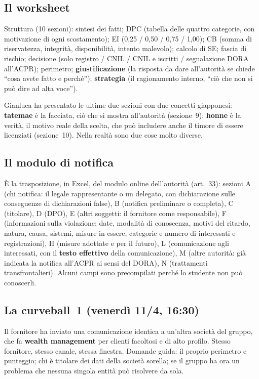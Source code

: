 \subsection{Il worksheet}
Struttura (10 sezioni): sintesi dei fatti; DPC (tabella delle quattro categorie, con motivazione di
ogni scostamento); EI (0,25 / 0,50 / 0,75 / 1,00); CB (somma di riservatezza, integrità, disponibilità,
intento malevolo); calcolo di SE; fascia di rischio; decisione (solo registro / CNIL / CNIL e iscritti
/ segnalazione DORA all'ACPR); perimetro; \textbf{giustificazione} (la risposta da dare all'autorità
se chiede ``cosa avete fatto e perché''); \textbf{strategia} (il ragionamento interno, ``ciò che non
si può dire ad alta voce'').

\begin{nota}
Gianluca ha presentato le ultime due sezioni con due concetti giapponesi: \textbf{tatemae} è la
facciata, ciò che si mostra all'autorità (sezione~9); \textbf{honne} è la verità, il motivo reale
della scelta, che può includere anche il timore di essere licenziati (sezione~10). Nella realtà sono
due cose molto diverse.
\end{nota}

\subsection{Il modulo di notifica}
È la trasposizione, in Excel, del modulo online dell'autorità (art.~33): sezioni A (chi notifica: il
legale rappresentante o un delegato, con dichiarazione sulle conseguenze di dichiarazioni false),
B (notifica preliminare o completa), C (titolare), D (DPO), E (altri soggetti: il fornitore come
responsabile), F (informazioni sulla violazione: date, modalità di conoscenza, motivi del ritardo,
natura, causa, sistemi, misure in essere, categorie e numero di interessati e registrazioni),
H (misure adottate e per il futuro), L (comunicazione agli interessati, con il \textbf{testo effettivo}
della comunicazione), M (altre autorità: già indicata la notifica all'ACPR ai sensi del DORA),
N (trattamenti transfrontalieri). Alcuni campi sono precompilati perché lo studente non può
conoscerli.

\subsection{La curveball~1 (venerdì 11/4, 16:30)}
Il fornitore ha inviato una comunicazione identica a un'altra società del gruppo, che fa
\textbf{wealth management} per clienti facoltosi e di alto profilo. Stesso fornitore, stesso canale,
stessa finestra. Domande guida: il proprio perimetro e punteggio; chi è titolare dei dati della
società sorella; se il gruppo ha ora un problema che nessuna singola entità può risolvere da sola.

